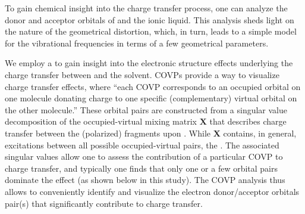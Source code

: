 \documentclass[%
  class = book,%
  crop = false,%
  float = true,%
  multi = true,%
  preview = false,%
]{standalone}
\let\cite\autocite
\begin{document}
{To gain chemical insight into the charge transfer process, one can analyze the donor and acceptor orbitals of  and the ionic liquid. This analysis sheds light on the nature of the geometrical distortion, which, in turn, leads to a simple model for the vibrational frequencies in terms of a few geometrical parameters.

We employ a \cite{Khaliullin2008}  to gain insight into the electronic structure effects underlying the charge transfer between  and the solvent. COVPs provide a way to visualize charge transfer effects, where ``each COVP corresponds to an occupied orbital on one molecule donating charge to one specific (complementary) virtual orbital on the other molecule.''\cite{Khaliullin2009} These orbital pairs are constructed from a singular value decomposition of the occupied-virtual mixing matrix \(\mathbf{X}\) that describes charge transfer between the (polarized) fragments upon . While \(\mathbf{X}\) contains, in general, excitations between all possible occupied-virtual pairs, the .  The associated singular values allow one to assess the contribution of a particular COVP to charge transfer, and typically one finds that only one or a few orbital pairs dominate the effect (as shown below in this study). The COVP analysis thus allows to conveniently identify and visualize the electron donor/acceptor orbitals pair(s) that significantly contribute to charge transfer.

}
\end{document}
